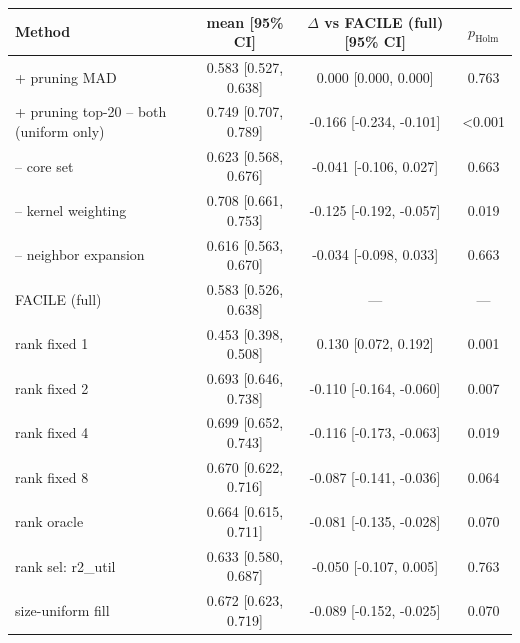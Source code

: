 \begin{tabular}{lccc}
\toprule
Method & mean [95\% CI] & $\Delta$ vs FACILE (full) [95\% CI] & $p_{\mathrm{Holm}}$ \\
\midrule
+ pruning MAD & 0.583 [0.527, 0.638] & 0.000 [0.000, 0.000] & 0.763 \\
+ pruning top-20%
-- both (uniform only) & 0.749 [0.707, 0.789] & -0.166 [-0.234, -0.101] & <0.001 \\
-- core set & 0.623 [0.568, 0.676] & -0.041 [-0.106, 0.027] & 0.663 \\
-- kernel weighting & 0.708 [0.661, 0.753] & -0.125 [-0.192, -0.057] & 0.019 \\
-- neighbor expansion & 0.616 [0.563, 0.670] & -0.034 [-0.098, 0.033] & 0.663 \\
FACILE (full) & 0.583 [0.526, 0.638] & --- & --- \\
rank fixed 1 & 0.453 [0.398, 0.508] & 0.130 [0.072, 0.192] & 0.001 \\
rank fixed 2 & 0.693 [0.646, 0.738] & -0.110 [-0.164, -0.060] & 0.007 \\
rank fixed 4 & 0.699 [0.652, 0.743] & -0.116 [-0.173, -0.063] & 0.019 \\
rank fixed 8 & 0.670 [0.622, 0.716] & -0.087 [-0.141, -0.036] & 0.064 \\
rank oracle & 0.664 [0.615, 0.711] & -0.081 [-0.135, -0.028] & 0.070 \\
rank sel: r2_util & 0.633 [0.580, 0.687] & -0.050 [-0.107, 0.005] & 0.763 \\
size-uniform fill & 0.672 [0.623, 0.719] & -0.089 [-0.152, -0.025] & 0.070 \\
\bottomrule
\end{tabular}

